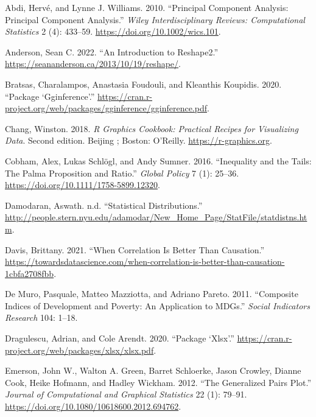 \documentclass[
]{svmono}
\newlength{\cslhangindent}
\newlength{\cslentryspacingunit} %
\newenvironment{CSLReferences}[2] %
 {%
  \setlength{\parindent}{0pt}
  \ifodd #1
  \let\oldpar\par
  \def\par{\hangindent=\cslhangindent\oldpar}
  \fi
  \setlength{\parskip}{#2\cslentryspacingunit}
 }%
 {}
\begin{document}
\hypertarget{refs}{}
\begin{CSLReferences}{1}{0}
\leavevmode{}%
Abdi, Hervé, and Lynne J. Williams. 2010. {``Principal Component Analysis: Principal Component Analysis.''} \emph{Wiley Interdisciplinary Reviews: Computational Statistics} 2 (4): 433--59. \url{https://doi.org/10.1002/wics.101}.

\leavevmode{}%
Anderson, Sean C. 2022. {``An Introduction to Reshape2.''} \url{https://seananderson.ca/2013/10/19/reshape/}.

\leavevmode{}%
Bratsas, Charalampos, Anastasia Foudouli, and Kleanthis Koupidis. 2020. {``Package {`}Gginference{'}.''} \url{https://cran.r-project.org/web/packages/gginference/gginference.pdf}.

\leavevmode{}%
Chang, Winston. 2018. \emph{R Graphics Cookbook: Practical Recipes for Visualizing Data}. Second edition. Beijing ; Boston: O'Reilly. \url{https://r-graphics.org}.

\leavevmode{}%
Cobham, Alex, Lukas Schlögl, and Andy Sumner. 2016. {``Inequality and the Tails: The Palma Proposition and Ratio.''} \emph{Global Policy} 7 (1): 25--36. \url{https://doi.org/10.1111/1758-5899.12320}.

\leavevmode{}%
Damodaran, Aswath. n.d. {``Statistical Distributions.''} \url{http://people.stern.nyu.edu/adamodar/New_Home_Page/StatFile/statdistns.htm}.

\leavevmode{}%
Davis, Brittany. 2021. {``When Correlation Is Better Than Causation.''} \url{https://towardsdatascience.com/when-correlation-is-better-than-causation-1cbfa2708fbb}.

\leavevmode{}%
De Muro, Pasquale, Matteo Mazziotta, and Adriano Pareto. 2011. {``Composite Indices of Development and Poverty: An Application to MDGs.''} \emph{Social Indicators Research} 104: 1--18.

\leavevmode{}%
Dragulescu, Adrian, and Cole Arendt. 2020. {``Package {`Xlsx'}.''} \url{https://cran.r-project.org/web/packages/xlsx/xlsx.pdf}.

\leavevmode{}%
Emerson, John W., Walton A. Green, Barret Schloerke, Jason Crowley, Dianne Cook, Heike Hofmann, and Hadley Wickham. 2012. {``The Generalized Pairs Plot.''} \emph{Journal of Computational and Graphical Statistics} 22 (1): 79--91. \url{https://doi.org/10.1080/10618600.2012.694762}.


\end{CSLReferences}
\end{document}
